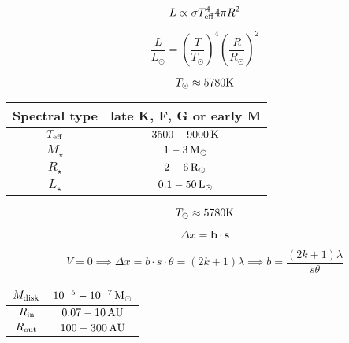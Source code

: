 \begin{equation}
	L \propto \sigma T_{\rm{eff}}^4 4 \pi R^2 
\end{equation}

\begin{equation}
	\frac{L}{L_{\odot}} = \left(  \frac{T}{T_{\odot}} \right) ^4 \left(  \frac{R}{R_{\odot}} \right) ^2
\end{equation}

\begin{equation}
	T_\odot \approx 5780 \rm{K}
\end{equation}



\begin{table}[h!]
	\begin{center}
 		\begin{tabular}{|c | c |} 
		\hline
		Spectral type & late K, F, G or early M\\
		\hline
		$T_{\rm{eff}}$ & $3500 - 9000\, \rm{K}$\\
		\hline
		$M_{\star}$ &  $1 - 3\, \rm{M_{\odot}}$\\
		\hline
		$R_{\star}$ & $2 - 6\, \rm{R_{\odot}}$\\
		\hline
		$L_{\star}$ &  $0.1 -50\, \rm{L_{\odot}}$ \\
		\hline
		\end{tabular}
	\end{center}
\end{table}


\begin{equation}
	T_\odot \approx 5780 \rm{K}
\end{equation}

\begin{equation}
	\Delta x = \boldsymbol{b} \cdot \boldsymbol{s} 
\end{equation}

\begin{equation}
	V = 0 \implies \Delta x = b \cdot s \cdot \theta = (2k+1) \lambda \implies  b = \frac{(2k+1) \lambda}{s \theta}
\end{equation}

\begin{table}[h!]
	\begin{center}
 		\begin{tabular}{|c | c |} 
		\hline
		$M_{\rm{disk}}$ &  $10^{-5} - 10^{-7}\, \rm{M_{\odot}}$\\
		\hline
		$R_{\rm{in}}$ & $0.07 - 10 \, \rm{AU}$\\
		\hline
		$R_{\rm{out}}$ &  $100-300\, \rm{AU}$ \\
		\hline
		\end{tabular}
	\end{center}
\end{table}

